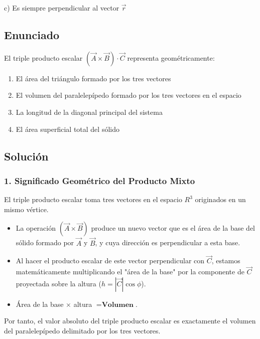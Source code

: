 \documentclass[12pt, a4paper]{article}
\begin{document}
\begin{tcolorbox}[colback=green!5!white, colframe=green!50!black, title=Respuesta Final]
\centering \Large c) Es siempre perpendicular al vector $\vec{r}$
\end{tcolorbox}

\newpage


\subsection*{Enunciado}
El triple producto escalar $(\vec{A} \times \vec{B}) \cdot \vec{C}$ representa geométricamente:
\begin{enumerate}[label=\alph*)]
    \item El área del triángulo formado por los tres vectores
    \item El volumen del paralelepípedo formado por los tres vectores en el espacio
    \item La longitud de la diagonal principal del sistema
    \item El área superficial total del sólido
\end{enumerate}

\subsection*{Solución}

\subsubsection*{1. Significado Geométrico del Producto Mixto}
El triple producto escalar toma tres vectores en el espacio $R^3$ originados en un mismo vértice.
\begin{itemize}
    \item La operación $(\vec{A} \times \vec{B})$ produce un nuevo vector que es el área de la base del sólido formado por $\vec{A}$ y $\vec{B}$, y cuya dirección es perpendicular a esta base.
    \item Al hacer el producto escalar de este vector perpendicular con $\vec{C}$, estamos matemáticamente multiplicando el "área de la base" por la componente de $\vec{C}$ proyectada sobre la altura ($h = |\vec{C}|\cos\phi$).
    \item Área de la base $\times$ altura $= \textbf{Volumen}$.
\end{itemize}
Por tanto, el valor absoluto del triple producto escalar es exactamente el volumen del paralelepípedo delimitado por los tres vectores.
\end{document}
